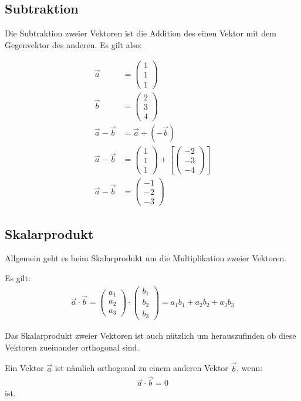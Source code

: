 \subsection{Subtraktion}
\begin{flushleft}
Die Subtraktion zweier Vektoren ist die Addition des einen Vektor mit dem Gegenvektor des anderen.
Es gilt also:

\begin{align}
    \vec{a} &= \begin{pmatrix} 1 \\ 1 \\ 1 \end{pmatrix} \\
    \vec{b} &= \begin{pmatrix} 2 \\ 3 \\ 4 \end{pmatrix} \\
    \vec{a}-\vec{b} &= \vec{a}+\left(-\vec{b}\right) \\
    \vec{a}-\vec{b} &= \begin{pmatrix} 1 \\ 1 \\ 1 \end{pmatrix}+\left[\begin{pmatrix}-2 \\ -3 \\ -4\end{pmatrix}\right] \\
    \vec{a}-\vec{b} &= \begin{pmatrix} -1 \\ -2 \\ -3 \end{pmatrix}
\end{align}
\end{flushleft}

\subsection{Skalarprodukt}
\begin{flushleft}
Allgemein geht es beim Skalarprodukt um die Multiplikation zweier Vektoren.

Es gilt:
\begin{align}
    \vec{a}\cdot\vec{b}=\begin{pmatrix} a_1 \\ a_2 \\ a_3 \end{pmatrix}\cdot\begin{pmatrix} b_1 \\ b_2 \\ b_3 \end{pmatrix}=a_1 b_1+a_2 b_2+a_3 b_3
\end{align}

Das Skalarprodukt zweier Vektoren ist auch nützlich um herauszufinden ob diese Vektoren zueinander
orthogonal sind.

Ein Vektor $\vec{a}$ ist nämlich orthogonal zu einem anderen Vektor $\vec{b}$, wenn:
\begin{align}
    \vec{a}\cdot\vec{b}=0
\end{align}
ist.
\end{flushleft}

